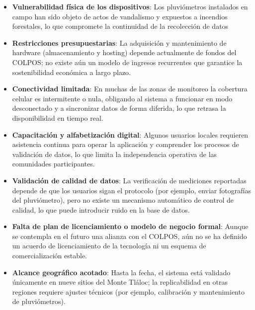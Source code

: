 \begin{itemize}
  \item \textbf{Vulnerabilidad física de los dispositivos}: Los pluviómetros instalados en campo han sido objeto de actos de vandalismo y expuestos a incendios forestales, lo que compromete la continuidad de la recolección de datos %
  \item \textbf{Restricciones presupuestarias}: La adquisición y mantenimiento de hardware (almacenamiento y hosting) depende actualmente de fondos del COLPOS; no existe aún un modelo de ingresos recurrentes que garantice la sostenibilidad económica a largo plazo.  
  \item \textbf{Conectividad limitada}: En muchas de las zonas de monitoreo la cobertura celular es intermitente o nula, obligando al sistema a funcionar en modo desconectado y a sincronizar datos de forma diferida, lo que retrasa la disponibilidad en tiempo real.  
  \item \textbf{Capacitación y alfabetización digital}: Algunos usuarios locales requieren asistencia continua para operar la aplicación y comprender los procesos de validación de datos, lo que limita la independencia operativa de las comunidades participantes.  
  \item \textbf{Validación de calidad de datos}: La verificación de mediciones reportadas depende de que los usuarios sigan el protocolo (por ejemplo, enviar fotografías del pluviómetro), pero no existe un mecanismo automático de control de calidad, lo que puede introducir ruido en la base de datos.  
  \item \textbf{Falta de plan de licenciamiento o modelo de negocio formal}: Aunque se contempla en el futuro una alianza con el COLPOS, aún no se ha definido un acuerdo de licenciamiento de la tecnología ni un esquema de comercialización estable.  
  \item \textbf{Alcance geográfico acotado}: Hasta la fecha, el sistema está validado únicamente en nueve sitios del Monte Tláloc; la replicabilidad en otras regiones requiere ajustes técnicos (por ejemplo, calibración y mantenimiento de pluviómetros).  
\end{itemize}




